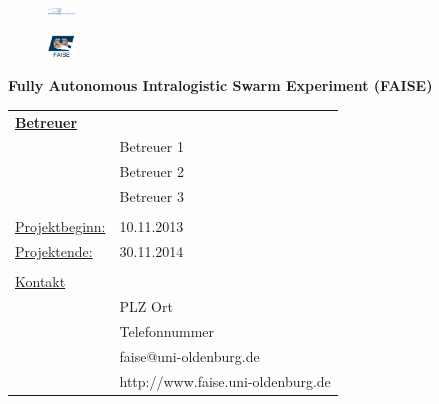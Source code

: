 \documentclass[11pt]{scrartcl}
\begin{document}
\begin{titlepage}
  \begin{centering}
  \begin{figure}[h!]
    \centering
    \includegraphics[width=20pt]{CvO-Oldenburg-Logo}    %
  \end{figure}

  \vspace*{0.8cm}

  \begin{figure}[h!]
    \centering
    \includegraphics[width=20pt]{faise_logo_gross}    %
  \end{figure}

  \vspace*{0.4cm}
  
  \textsf{\Huge \textbf{Fully Autonomous Intralogistic Swarm Experiment (FAISE)}}

  \vspace*{0.5cm}
	\begin{table}[h]
\centering
  \begin{tabular}{ll}
   \textbf{\underline{Betreuer}} &  \\
   & Betreuer 1 \\
	 & Betreuer 2 \\
	 & Betreuer 3 \\ 
	 &  \\
	 \underline{Projektbeginn:}& 10.11.2013 \\
		\underline{Projektende:}& 30.11.2014 \\
		&  \\
	  \underline{Kontakt} &  \\
		& PLZ Ort\\
    & Telefonnummer\\
		& faise@uni-oldenburg.de\\
		& http://www.faise.uni-oldenburg.de
\end{tabular}
\end{table}
  \end{centering}
  
\end{titlepage}
\end{document}
